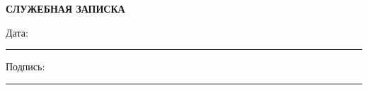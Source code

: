 \documentclass[12pt]{article}
\begin{document}
\begin{center}
\textbf{\LARGE СЛУЖЕБНАЯ ЗАПИСКА}
\end{center}

\vspace{1cm}


\vfill

\noindent
Дата: \rule{5cm}{0.4pt} \hfill Подпись: \rule{5cm}{0.4pt}
\end{document}
